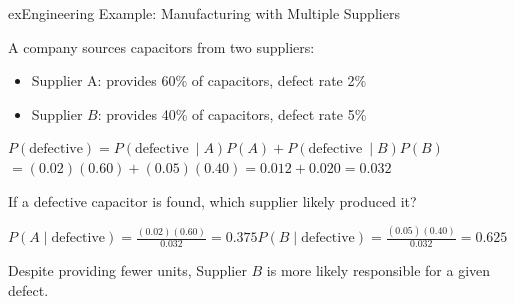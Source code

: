 \begin{PSbox}[unbreakable]{ex}{Engineering Example: Manufacturing with Multiple Suppliers}

A company sources capacitors from two suppliers:

\begin{itemize}
\tightlist
\item
  Supplier A: provides 60\% of capacitors, defect rate 2\%
\item
  Supplier $B$: provides 40\% of capacitors, defect rate 5\%
\end{itemize}

$P(\text{defective}) = P(\text{defective}\ \mid A)P(A) + P(\text{defective}\ \mid B)P(B)$\PSbr{}$= (0.02)(0.60) + (0.05)(0.40)$\PSbr{}$= 0.012 + 0.020 = 0.032$

If a defective capacitor is found, which supplier likely produced it?

$\displaystyle P(A \mid \text{defective}) = \frac{(0.02)(0.60)}{0.032} = 0.375$\PSbr{}$\displaystyle P(B \mid \text{defective}) = \frac{(0.05)(0.40)}{0.032} = 0.625$

Despite providing fewer units, Supplier $B$ is more likely responsible for a given defect.

\end{PSbox}


